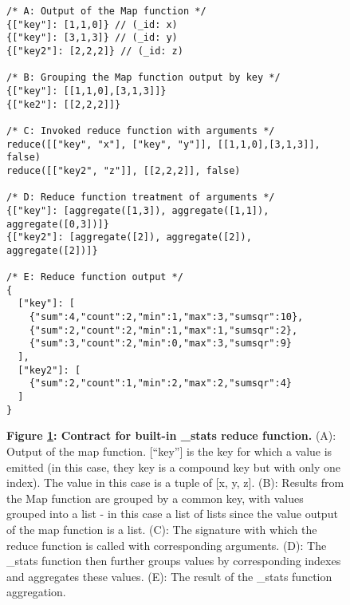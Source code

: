 \begin{figure}[H]
  \centering
  \begin{mdframed}[rightline=true,leftline=true]
    \begin{verbatim}
/* A: Output of the Map function */
{["key"]: [1,1,0]} // (_id: x)
{["key"]: [3,1,3]} // (_id: y)
{["key2"]: [2,2,2]} // (_id: z)

/* B: Grouping the Map function output by key */
{["key"]: [[1,1,0],[3,1,3]]}
{["ke2"]: [[2,2,2]]}

/* C: Invoked reduce function with arguments */
reduce([["key", "x"], ["key", "y"]], [[1,1,0],[3,1,3]], false)
reduce([["key2", "z"]], [[2,2,2]], false)

/* D: Reduce function treatment of arguments */
{["key"]: [aggregate([1,3]), aggregate([1,1]),  aggregate([0,3])]}
{["key2"]: [aggregate([2]), aggregate([2]),  aggregate([2])]}

/* E: Reduce function output */
{
  ["key"]: [
    {"sum":4,"count":2,"min":1,"max":3,"sumsqr":10},
    {"sum":2,"count":2,"min":1,"max":1,"sumsqr":2},
    {"sum":3,"count":2,"min":0,"max":3,"sumsqr":9}
  ],
  ["key2"]: [
    {"sum":2,"count":1,"min":2,"max":2,"sumsqr":4}
  ]
}
    \end{verbatim}
  \end{mdframed}
  \caption[\_stats function contract]{\textbf{Figure \ref{fig-stats-reduce-fn}: Contract for built-in \_stats reduce function.} (A): Output of the map function. [``key''] is the key for which a value is emitted (in this case, they key is a compound key but with only one index). The value in this case is a tuple of [x, y, z]. (B): Results from the Map function are grouped by a common key, with values grouped into a list - in this case a list of lists since the value output of the map function is a list. (C): The signature with which the reduce function is called with corresponding arguments. (D): The \_stats function then further groups values by corresponding indexes and aggregates these values. (E): The result of the \_stats function aggregation.}
  \label{fig-stats-reduce-fn}
\end{figure}